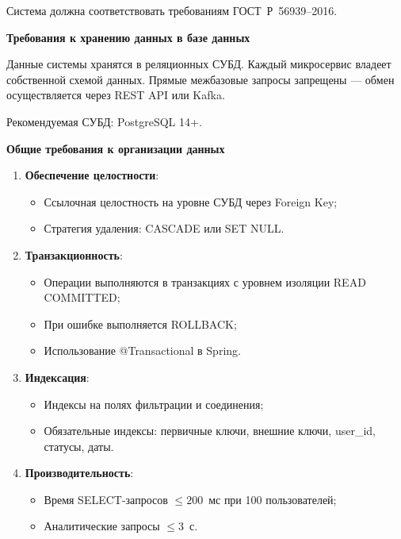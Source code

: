 \documentclass{bmstu}
\begin{document}
Система должна соответствовать требованиям ГОСТ~Р~56939--2016.

\begin{center}
    \textbf{Требования к хранению данных в базе данных}
\end{center}

Данные системы хранятся в реляционных СУБД. Каждый микросервис владеет собственной схемой данных. Прямые межбазовые запросы запрещены — обмен осуществляется через REST API или Kafka.

Рекомендуемая СУБД: PostgreSQL 14+.

\begin{center}
    \textbf{Общие требования к организации данных}
\end{center}

\begin{enumerate}
    \item \textbf{Обеспечение целостности}:
    \begin{itemize}
        \item Ссылочная целостность на уровне СУБД через Foreign Key;
        \item Стратегия удаления: CASCADE или SET NULL.
    \end{itemize}
    
    \item \textbf{Транзакционность}:
    \begin{itemize}
        \item Операции выполняются в транзакциях с уровнем изоляции READ COMMITTED;
        \item При ошибке выполняется ROLLBACK;
        \item Использование @Transactional в Spring.
    \end{itemize}
    
    \item \textbf{Индексация}:
    \begin{itemize}
        \item Индексы на полях фильтрации и соединения;
        \item Обязательные индексы: первичные ключи, внешние ключи, user\_id, статусы, даты.
    \end{itemize}
    
    \item \textbf{Производительность}:
    \begin{itemize}
        \item Время SELECT-запросов $\leq 200$~мс при 100 пользователей;
        \item Аналитические запросы $\leq 3$~с.
    \end{itemize}
\end{enumerate}
\end{document}
